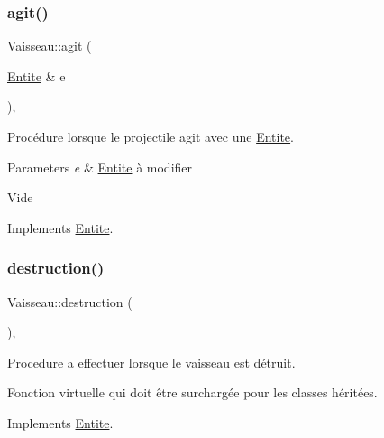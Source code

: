 \mbox{\label{class_vaisseau_a7950f1a06690d5f5eec5e38f3021a04c}} 
\subsubsection{\texorpdfstring{agit()}{agit()}}
{\footnotesize\ttfamily Vaisseau\+::agit (\begin{DoxyParamCaption}\item[{\mbox{\hyperlink{class_entite}{Entite}} \&}]{e }\end{DoxyParamCaption})\hspace{0.3cm}{\ttfamily [override]}, {\ttfamily [virtual]}}



Procédure lorsque le projectile agit avec une \mbox{\hyperlink{class_entite}{Entite}}. 


\begin{DoxyParams}{Parameters}
{\em e} & \mbox{\hyperlink{class_entite}{Entite}} à modifier\\
\hline
\end{DoxyParams}
Vide 

Implements \mbox{\hyperlink{class_entite_a848ec47afac1d7ba970a2bcab5dc7b3b}{Entite}}.

\mbox{\label{class_vaisseau_a6d7506acb12c0367989066c899ec7949}} 
\subsubsection{\texorpdfstring{destruction()}{destruction()}}
{\footnotesize\ttfamily Vaisseau\+::destruction (\begin{DoxyParamCaption}{ }\end{DoxyParamCaption})\hspace{0.3cm}{\ttfamily [override]}, {}}



Procedure a effectuer lorsque le vaisseau est détruit. 

Fonction virtuelle qui doit être surchargée pour les classes héritées. 

Implements \mbox{\hyperlink{class_entite_af5c424f69b2c880ae9c12786abd28592}{Entite}}.



